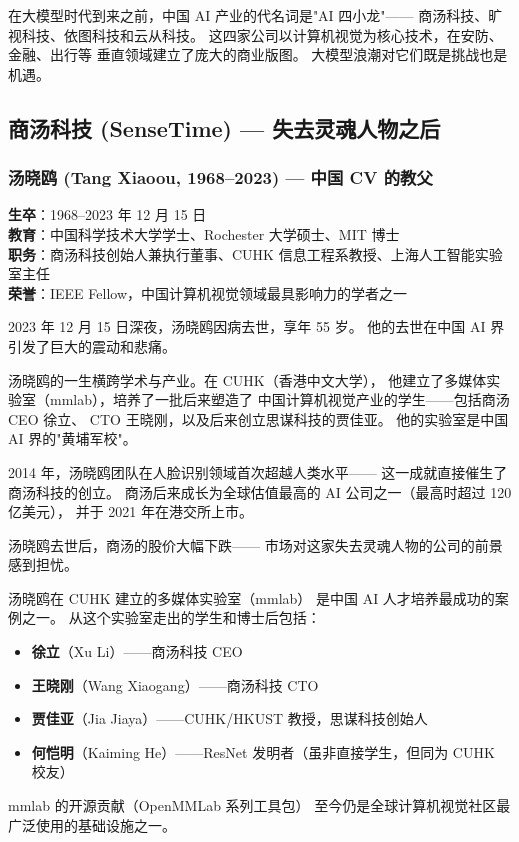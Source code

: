 在大模型时代到来之前，中国 AI 产业的代名词是"AI 四小龙"——
商汤科技、旷视科技、依图科技和云从科技。
这四家公司以计算机视觉为核心技术，在安防、金融、出行等
垂直领域建立了庞大的商业版图。
大模型浪潮对它们既是挑战也是机遇。


\subsection{商汤科技 (SenseTime) — 失去灵魂人物之后}

\subsubsection{汤晓鸥 (Tang Xiaoou, 1968--2023) — 中国 CV 的教父}

\begin{keybox}
\textbf{生卒}：1968--2023 年 12 月 15 日 \\
\textbf{教育}：中国科学技术大学学士、Rochester 大学硕士、MIT 博士 \\
\textbf{职务}：商汤科技创始人兼执行董事、CUHK 信息工程系教授、上海人工智能实验室主任 \\
\textbf{荣誉}：IEEE Fellow，中国计算机视觉领域最具影响力的学者之一
\end{keybox}

2023 年 12 月 15 日深夜，汤晓鸥因病去世，享年 55 岁。
他的去世在中国 AI 界引发了巨大的震动和悲痛。

汤晓鸥的一生横跨学术与产业。在 CUHK（香港中文大学），
他建立了多媒体实验室（mmlab），培养了一批后来塑造了
中国计算机视觉产业的学生——包括商汤 CEO 徐立、
CTO 王晓刚，以及后来创立思谋科技的贾佳亚。
他的实验室是中国 AI 界的"黄埔军校"。

2014 年，汤晓鸥团队在人脸识别领域首次超越人类水平——
这一成就直接催生了商汤科技的创立。
商汤后来成长为全球估值最高的 AI 公司之一（最高时超过 120 亿美元），
并于 2021 年在港交所上市。

汤晓鸥去世后，商汤的股价大幅下跌——
市场对这家失去灵魂人物的公司的前景感到担忧。

\begin{whybox}
汤晓鸥在 CUHK 建立的多媒体实验室（mmlab）
是中国 AI 人才培养最成功的案例之一。
从这个实验室走出的学生和博士后包括：
\begin{itemize}[noitemsep]
  \item \textbf{徐立}（Xu Li）——商汤科技 CEO
  \item \textbf{王晓刚}（Wang Xiaogang）——商汤科技 CTO
  \item \textbf{贾佳亚}（Jia Jiaya）——CUHK/HKUST 教授，思谋科技创始人
  \item \textbf{何恺明}（Kaiming He）——ResNet 发明者（虽非直接学生，但同为 CUHK 校友）
\end{itemize}
mmlab 的开源贡献（OpenMMLab 系列工具包）
至今仍是全球计算机视觉社区最广泛使用的基础设施之一。
\end{whybox}

